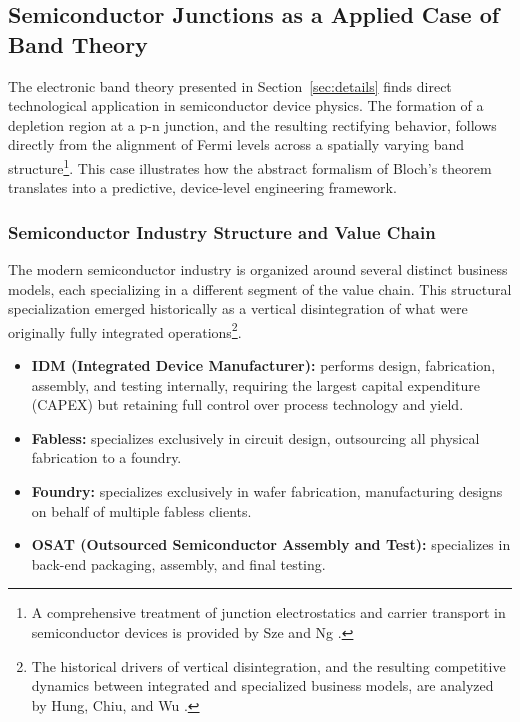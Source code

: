 \documentclass[10pt,a4paper]{article}
\begin{document}
\subsection{Semiconductor Junctions as a Applied Case of Band Theory}

The electronic band theory presented in Section~\ref{sec:details} finds direct 
technological application in semiconductor device physics. The formation of a 
depletion region at a p-n junction, and the resulting rectifying behavior, follows 
directly from the alignment of Fermi levels across a spatially varying band 
structure\footnote{A comprehensive treatment of junction electrostatics and 
carrier transport in semiconductor devices is provided by Sze and Ng 
\cite{sze2006}.}. This case illustrates how the abstract formalism of Bloch's 
theorem translates into a predictive, device-level engineering framework.

\subsubsection{Semiconductor Industry Structure and Value Chain}

The modern semiconductor industry is organized around several distinct business 
models, each specializing in a different segment of the value chain. This 
structural specialization emerged historically as a vertical disintegration of 
what were originally fully integrated operations\footnote{The historical drivers 
of vertical disintegration, and the resulting competitive dynamics between 
integrated and specialized business models, are analyzed by Hung, Chiu, and Wu 
\cite{hung2017}.}.

\begin{itemize}
    \item \textbf{IDM (Integrated Device Manufacturer):} performs design, 
    fabrication, assembly, and testing internally, requiring the largest capital 
    expenditure (CAPEX) but retaining full control over process technology and 
    yield.
    \item \textbf{Fabless:} specializes exclusively in circuit design, 
    outsourcing all physical fabrication to a foundry.
    \item \textbf{Foundry:} specializes exclusively in wafer fabrication, 
    manufacturing designs on behalf of multiple fabless clients.
    \item \textbf{OSAT (Outsourced Semiconductor Assembly and Test):} specializes 
    in back-end packaging, assembly, and final testing.
\end{itemize}
\end{document}
